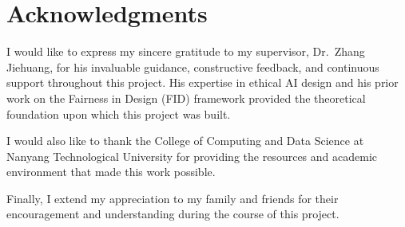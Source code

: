 \chapter*{Acknowledgments}

I would like to express my sincere gratitude to my supervisor, Dr.\ Zhang Jiehuang, for his invaluable guidance, constructive feedback, and continuous support throughout this project. His expertise in ethical AI design and his prior work on the Fairness in Design (FID) framework provided the theoretical foundation upon which this project was built.

I would also like to thank the College of Computing and Data Science at Nanyang Technological University for providing the resources and academic environment that made this work possible.

Finally, I extend my appreciation to my family and friends for their encouragement and understanding during the course of this project.
